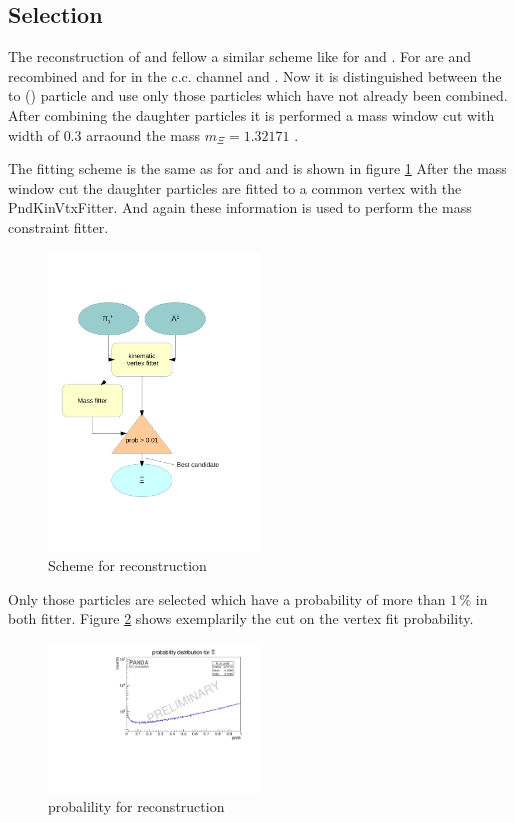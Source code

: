 	\subsection*{Selection}
		The reconstruction of \cascade and \anticascade fellow a similar scheme like for \lam and \alam.
		For \anticascade are \alam and \piplusone recombined and for \cascade in the c.c. channel \lam and \piminusone.
		Now it is distinguished between the to \piplus (\piminus) particle and use only those particles which have not already been combined.
		After combining the daughter particles it is performed a mass window cut with width of $0.3$\massunit 
		arraound the \cascade mass $m_{\Xi} = 1.32171$ \massunit \cite{PDG}.
		 
		The fitting scheme is the same as for \lam and \alam and is shown in figure \ref{fig:anticascade_scheme} 
		After the mass window cut the daughter particles are fitted to a common vertex with the PndKinVtxFitter.
		And again these information is used to perform the mass constraint fitter. 
		
		\begin{figure}
			\centering
				\includegraphics[width=0.50\textwidth]{./plots/combineAntiCascade.pdf}
			\caption{Scheme for \anticascade reconstruction}
			\label{fig:anticascade_scheme}
		\end{figure}
		
		Only those particles are selected which have a \chisq probability of more than $1\,\%$ in both fitter. 
		Figure \ref{fig:XiPlus_prob} shows exemplarily the cut on the vertex fit probability.
		
		\begin{figure}
			\centering
				\includegraphics[width=0.50\textwidth]{./plots/Xi/XiPlus_prob.pdf}
			\caption{\chisq probalility for \anticascade reconstruction}
			\label{fig:XiPlus_prob}
		\end{figure}
			
